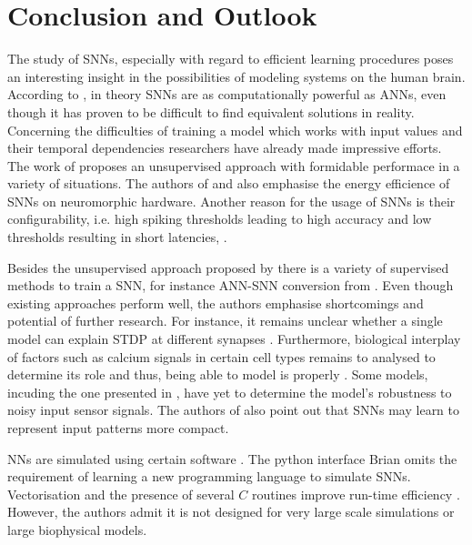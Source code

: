 \section{Conclusion and Outlook}
\label{sec:conclusion}

The study of \acp{SNN}, especially with regard to efficient learning procedures poses an interesting insight in the possibilities of modeling
systems on the human brain.
According to \cite{ANN_SNN_conversion}, in theory \acp{SNN} are as computationally powerful as \acp{ANN}, 
even though it has proven to be difficult to find equivalent solutions in reality.
Concerning the difficulties of training a model which works with input values and their temporal dependencies researchers have already made 
impressive efforts.
The work of \cite{SNN} proposes an unsupervised approach with formidable performace in a variety of situations.
The authors of \cite{SNN} and \cite{Synaptic_plasticity} also emphasise the energy efficience of \acp{SNN} on neuromorphic hardware.
Another reason for the usage of \acp{SNN} is their configurability, 
i.e. high spiking thresholds leading to high accuracy and low thresholds resulting in short latencies, \cite{ANN_SNN_conversion}.

Besides the unsupervised approach proposed by \cite{SNN} there is a variety of supervised methods to train a \ac{SNN}, 
for instance \ac{ANN}-\ac{SNN} conversion from \cite{DIET_SNN}.
Even though existing approaches perform well, the authors emphasise shortcomings and potential of further research.
For instance, it remains unclear whether a single model can explain \ac{STDP} at different synapses \cite{STDP_hebbian}.
Furthermore, biological interplay of factors such as calcium signals in certain cell types remains to analysed to determine its role and thus, being able to model is properly \cite{STDP_hebbian}.
Some models, incuding the one presented in \cite{object_detection_SNN}, have yet to determine the model's robustness to noisy input sensor signals.
The authors of \cite{object_detection_SNN} also point out that \acp{SNN} may learn to represent input patterns more compact.

\Acp{NN} are simulated using certain software \cite{simulation_Brian}.
The python interface Brian omits the requirement of learning a new programming language to simulate \acp{SNN}.
Vectorisation and the presence of several $C$ routines improve run-time efficiency \cite{simulation_Brian}.
However, the authors admit it is not designed for very large scale simulations or large biophysical models.

